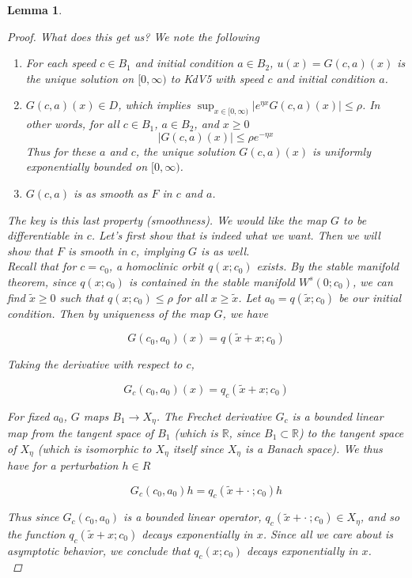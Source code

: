 \documentclass[12pt]{article}
\def\R{{\mathbb R}}
\newtheorem{lemma}{Lemma}
\begin{document}
\begin{lemma}
\begin{proof}
What does this get us? We note the following

\begin{enumerate}
	\item For each speed $c \in B_1$ and initial condition $a \in B_2$, $u(x) = G(c, a)(x)$ is the unique solution on $[0, \infty)$ to KdV5 with speed $c$ and initial condition $a$.

	\item $G(c, a)(x) \in D$, which implies $\sup_{x \in [0, \infty)} |e^{\eta x} G(c, a)(x)| \leq \rho$. In other words, for all $c \in B_1$, $a \in B_2$, and $x \geq 0$
	\begin{equation}
		|G(c, a)(x)| \leq \rho e^{-\eta x}
	\end{equation}
	Thus for these $a$ and $c$, the unique solution $G(c, a)(x)$ is uniformly exponentially bounded on $[0, \infty)$.

	\item $G(c, a)$ is as smooth as $F$ in $c$ and $a$.
\end{enumerate}

The key is this last property (smoothness). We would like the map $G$ to be differentiable in $c$. Let's first show that is indeed what we want. Then we will show that $F$ is smooth in $c$, implying $G$ is as well.\\

Recall that for $c = c_0$, a homoclinic orbit $q(x; c_0)$ exists. By the stable manifold theorem, since $q(x; c_0)$ is contained in the stable manifold $W^s(0; c_0)$, we can find $\tilde{x} \geq 0$ such that $q(x; c_0) \leq \rho$ for all $x \geq \tilde{x}$. Let $a_0 = q(\tilde{x}; c_0)$ be our initial condition. Then by uniqueness of the map $G$, we have 

\[
G(c_0, a_0)(x) = q(\tilde{x} + x; c_0)
\]

Taking the derivative with respect to $c$,

\[
G_c(c_0, a_0)(x) = q_c(\tilde{x} + x; c_0)
\]

For fixed $a_0$, $G$ maps $B_1 \rightarrow X_\eta$. The Frechet derivative $G_c$ is a bounded linear map from the tangent space of $B_1$ (which is $\R$, since $B_1 \subset \R$) to the tangent space of $X_\eta$ (which is isomorphic to $X_\eta$ itself since $X_\eta$ is a Banach space). We thus have for a perturbation $h \in R$

\[
G_c(c_0, a_0)h = q_c(\tilde{x} + \cdot \: ; c_0) h
\]

Thus since $G_c(c_0, a_0)$ is a bounded linear operator, $q_c(\tilde{x} + \cdot \: ; c_0) \in X_\eta$, and so the function $q_c(\tilde{x} + x ; c_0)$ decays exponentially in $x$. Since all we care about is asymptotic behavior, we conclude that $q_c(x ; c_0)$ decays exponentially in $x$.\\


\end{proof}
\end{lemma}
\end{document}
